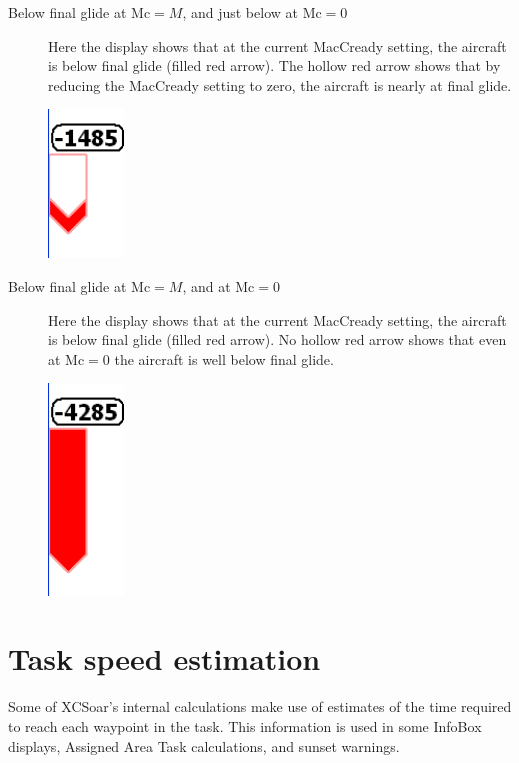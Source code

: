 \documentclass[a4paper,12pt]{refrep}
\newcommand{\InfoBox}[0]{{InfoBox}}
\begin{document}
\begin{description}
\item[Below final glide at Mc$=M$, and just below at Mc$=0$]
  Here the display shows that at the current MacCready setting, the aircraft
  is below final glide (filled red arrow).  The hollow red arrow
  shows that by reducing the MacCready setting to zero, the aircraft is
  nearly at final glide.
\begin{center}
\includegraphics[angle=0,width=2cm,keepaspectratio='true']{figures/fig-finalglide-littlebelow.png}
\end{center}

\item[Below final glide at Mc$=M$, and at Mc$=0$]
  Here the display shows that at the current MacCready setting, the aircraft
  is below final glide (filled red arrow).  No hollow red arrow
  shows that even at Mc$=0$ the aircraft is well below final glide.
\begin{center}
\includegraphics[angle=0,width=2cm,keepaspectratio='true']{figures/fig-finalglide-allbelow.png}
\end{center}

\end{description}

\section{Task speed estimation}\label{sec:task-speed-estim}

Some of XCSoar's internal calculations make use of estimates of the
time required to reach each waypoint in the task.  This information is
used in some {\InfoBox} displays, Assigned Area Task calculations, and
sunset warnings.
\end{document}
